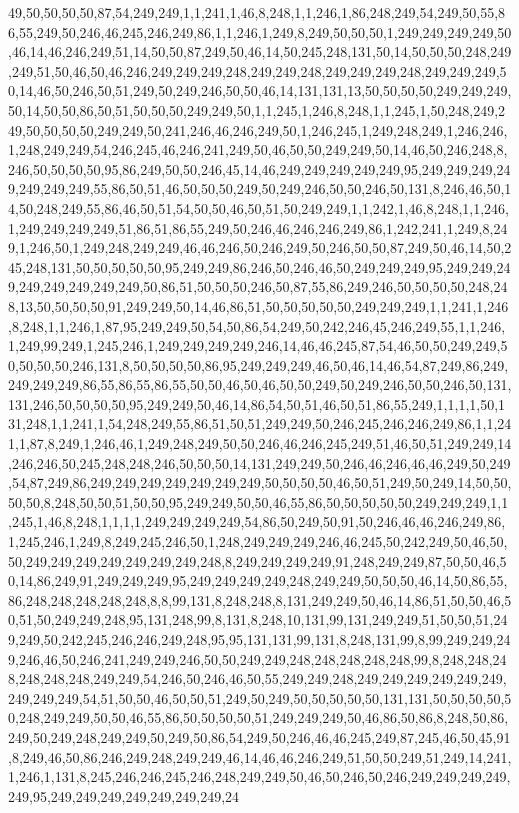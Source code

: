 49,50,50,50,50,87,54,249,249,1,1,241,1,46,8,248,1,1,246,1,86,248,249,54,249,50,55,86,55,249,50,246,46,245,246,249,86,1,1,246,1,249,8,249,50,50,50,1,249,249,249,249,50,46,14,46,246,249,51,14,50,50,87,249,50,46,14,50,245,248,131,50,14,50,50,50,248,249,249,51,50,46,50,46,246,249,249,249,248,249,249,248,249,249,249,248,249,249,249,50,14,46,50,246,50,51,249,50,249,246,50,50,46,14,131,131,13,50,50,50,50,249,249,249,50,14,50,50,86,50,51,50,50,50,249,249,50,1,1,245,1,246,8,248,1,1,245,1,50,248,249,249,50,50,50,50,249,249,50,241,246,46,246,249,50,1,246,245,1,249,248,249,1,246,246,1,248,249,249,54,246,245,46,246,241,249,50,46,50,50,249,249,50,14,46,50,246,248,8,246,50,50,50,50,95,86,249,50,50,246,45,14,46,249,249,249,249,249,95,249,249,249,249,249,249,249,55,86,50,51,46,50,50,50,249,50,249,246,50,50,246,50,131,8,246,46,50,14,50,248,249,55,86,46,50,51,54,50,50,46,50,51,50,249,249,1,1,242,1,46,8,248,1,1,246,1,249,249,249,249,51,86,51,86,55,249,50,246,46,246,246,249,86,1,242,241,1,249,8,249,1,246,50,1,249,248,249,249,46,46,246,50,246,249,50,246,50,50,87,249,50,46,14,50,245,248,131,50,50,50,50,50,95,249,249,86,246,50,246,46,50,249,249,249,95,249,249,249,249,249,249,249,249,50,86,51,50,50,50,246,50,87,55,86,249,246,50,50,50,50,248,248,13,50,50,50,50,91,249,249,50,14,46,86,51,50,50,50,50,50,249,249,249,1,1,241,1,246,8,248,1,1,246,1,87,95,249,249,50,54,50,86,54,249,50,242,246,45,246,249,55,1,1,246,1,249,99,249,1,245,246,1,249,249,249,249,246,14,46,46,245,87,54,46,50,50,249,249,50,50,50,50,246,131,8,50,50,50,50,86,95,249,249,249,46,50,46,14,46,54,87,249,86,249,249,249,249,86,55,86,55,86,55,50,50,46,50,46,50,50,249,50,249,246,50,50,246,50,131,131,246,50,50,50,50,95,249,249,50,46,14,86,54,50,51,46,50,51,86,55,249,1,1,1,1,50,131,248,1,1,241,1,54,248,249,55,86,51,50,51,249,249,50,246,245,246,246,249,86,1,1,241,1,87,8,249,1,246,46,1,249,248,249,50,50,246,46,246,245,249,51,46,50,51,249,249,14,246,246,50,245,248,248,246,50,50,50,14,131,249,249,50,246,46,246,46,46,249,50,249,54,87,249,86,249,249,249,249,249,249,249,50,50,50,50,46,50,51,249,50,249,14,50,50,50,50,8,248,50,50,51,50,50,95,249,249,50,50,46,55,86,50,50,50,50,50,249,249,249,1,1,245,1,46,8,248,1,1,1,1,249,249,249,249,54,86,50,249,50,91,50,246,46,46,246,249,86,1,245,246,1,249,8,249,245,246,50,1,248,249,249,249,246,46,245,50,242,249,50,46,50,50,249,249,249,249,249,249,249,248,8,249,249,249,249,91,248,249,249,87,50,50,46,50,14,86,249,91,249,249,249,95,249,249,249,249,248,249,249,50,50,50,46,14,50,86,55,86,248,248,248,248,248,8,8,99,131,8,248,248,8,131,249,249,50,46,14,86,51,50,50,46,50,51,50,249,249,248,95,131,248,99,8,131,8,248,10,131,99,131,249,249,51,50,50,51,249,249,50,242,245,246,246,249,248,95,95,131,131,99,131,8,248,131,99,8,99,249,249,249,246,46,50,246,241,249,249,246,50,50,249,249,248,248,248,248,248,99,8,248,248,248,248,248,248,249,249,54,246,50,246,46,50,55,249,249,248,249,249,249,249,249,249,249,249,249,54,51,50,50,46,50,50,51,249,50,249,50,50,50,50,50,131,131,50,50,50,50,50,248,249,249,50,50,46,55,86,50,50,50,50,51,249,249,249,50,46,86,50,86,8,248,50,86,249,50,249,248,249,249,50,249,50,86,54,249,50,246,46,46,245,249,87,245,46,50,45,91,8,249,46,50,86,246,249,248,249,249,46,14,46,46,246,249,51,50,50,249,51,249,14,241,1,246,1,131,8,245,246,246,245,246,248,249,249,50,46,50,246,50,246,249,249,249,249,249,95,249,249,249,249,249,249,249,24